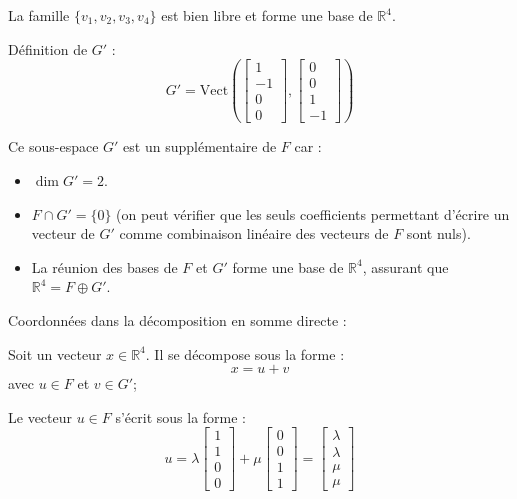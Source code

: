 \documentclass[10pt,a4paper]{article}
\begin{document}
La famille \( \{ v_1, v_2, v_3, v_4 \} \) est bien libre et forme une base de \( \mathbb{R}^4 \).

Définition de \( G' \) :
\[
G' = \text{Vect} \left( \begin{bmatrix} 1 \\ -1 \\ 0 \\ 0 \end{bmatrix}, \begin{bmatrix} 0 \\ 0 \\ 1 \\ -1 \end{bmatrix} \right)
\]

Ce sous-espace \( G' \) est un supplémentaire de \( F \) car :
\begin{itemize}
    \item \( \dim G' = 2 \).
    \item \( F \cap G' = \{0\} \) (on peut vérifier que les seuls coefficients permettant d'écrire
    un vecteur de \( G' \) comme combinaison linéaire des vecteurs de \( F \) sont nuls).
    \item La réunion des bases de \( F \) et \( G' \) forme une base de \( \mathbb{R}^4 \), assurant
    que \( \mathbb{R}^4 = F \oplus G' \).
\end{itemize}

\q Coordonnées dans la décomposition en somme directe :

Soit un vecteur \( x \in \mathbb{R}^4 \). Il se décompose sous la forme :
\[
x = u + v
\]
avec \( u \in F \) et \( v \in G' \);

Le vecteur \( u \in F \) s'écrit sous la forme :
\[
u = \lambda \begin{bmatrix} 1 \\ 1 \\ 0 \\ 0 \end{bmatrix} + \mu \begin{bmatrix} 0 \\ 0 \\ 1 \\ 1 \end{bmatrix}
= \begin{bmatrix} \lambda \\ \lambda \\ \mu \\ \mu \end{bmatrix}
\]
\end{document}

